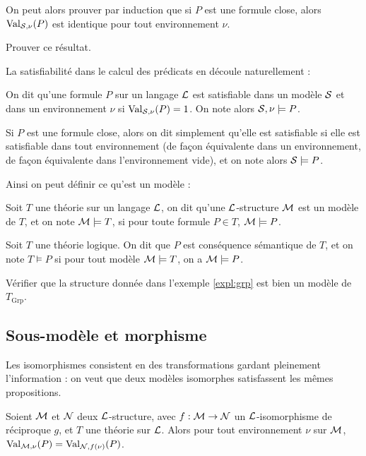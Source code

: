 On peut alors prouver par induction que si $P$ est une formule close, alors $\mathrm{Val}_{\mathcal S,\nu}(P)$ est identique pour tout environnement $\nu$.

\begin{exo}
    Prouver ce résultat.
\end{exo}

La satisfiabilité dans le calcul des prédicats en découle naturellement :

\begin{defi}[Satisfiabilité]
    On dit qu'une formule $P$ sur un langage $\mathcal L$ est satisfiable dans un modèle $\mathcal S$ et dans un environnement $\nu$ si $\mathrm{Val}_{\mathcal S,\nu}(P)=1$. On note alors $\mathcal S,\nu\models P$.

    Si $P$ est une formule close, alors on dit simplement qu'elle est satisfiable si elle est satisfiable dans tout environnement (de façon équivalente dans un environnement, de façon équivalente dans l'environnement vide), et on note alors $\mathcal S\models P$.
\end{defi}

Ainsi on peut définir ce qu'est un modèle :

\begin{defi}
    Soit $T$ une théorie sur un langage $\mathcal L$, on dit qu'une $\mathcal L$-structure $\mathcal M$ est un modèle de $T$, et on note $\mathcal M\models T$, si pour toute formule $P\in T$, $\mathcal M\models P$.
\end{defi}

\begin{defi}
    Soit $T$ une théorie logique. On dit que $P$ est conséquence sémantique de $T$, et on note $T\vDash P$ si pour tout modèle $\mathcal M\models T$, on a $\mathcal M\models P$.
\end{defi}

\begin{exo}
    Vérifier que la structure donnée dans l'exemple \ref{expl:grp} est bien un modèle de $T_{\mathrm{Grp}}$.
\end{exo}

\subsection{Sous-modèle et morphisme}

Les isomorphismes consistent en des transformations gardant pleinement l'information : on veut que deux modèles isomorphes satisfassent les mêmes propositions.

\begin{lem}
    Soient $\mathcal M$ et $\mathcal N$ deux $\mathcal L$-structure, avec $f : \mathcal M\to\mathcal N$ un $\mathcal L$-isomorphisme de réciproque $g$, et $T$ une théorie sur $\mathcal L$. Alors pour tout environnement $\nu$ sur $\mathcal M$, $\mathrm{Val}_{\mathcal M,\nu}(P) = \mathrm{Val}_{\mathcal N,f(\nu)}(P)$.
\end{lem}

